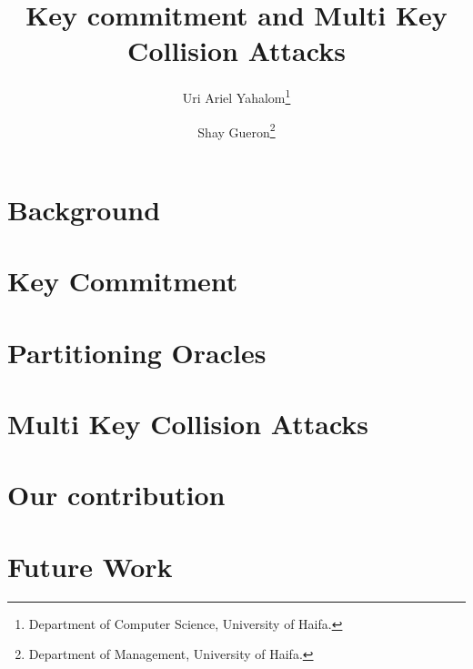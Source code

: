\documentclass[12pt]{article}
\title{Key commitment and Multi Key Collision Attacks}
\author{Uri Ariel Yahalom\thanks{Department of Computer Science, University of Haifa.}
\and Shay Gueron\thanks{Department of Management, University of Haifa.}}
\date{}
\begin{document}
    
    \newpage


    \section{Background}\label{sec:background}
    
    \newpage


    \section{Key Commitment}\label{sec:key-commitment}
    
    \newpage

    \section{Partitioning Oracles}\label{sec:partitioning-oracles}
    
    \newpage


    \section{Multi Key Collision Attacks}\label{sec:multi-key-collision-attacks}
    
    \newpage


    \section{Our contribution}\label{sec:our-contribution}
    
    \newpage



    \section{Future Work}\label{sec:future-work}
    
    \newpage


    
    
    \newpage
\end{document}
